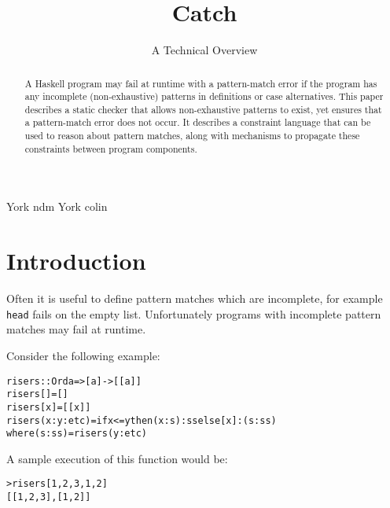 \documentclass[preprint]{sigplanconf}
\newcommand{\T}[1]{\texttt{#1}}
\newenvironment{code}{\begin{alltt}\small}{\end{alltt}}
\begin{document}
\copyrightdata{[to be supplied]}

\titlebanner{\today{} - \currenttime{}}        %

\title{Catch}
\subtitle{A Technical Overview}

           {York}
           {ndm}
           {York}
           {colin}

\maketitle

\begin{abstract}
A Haskell program may fail at runtime with a pattern-match error if the program has any incomplete (non-exhaustive) patterns in definitions or case alternatives. This paper describes a static checker that allows non-exhaustive patterns to exist, yet ensures that a pattern-match error does not occur. It describes a constraint language that can be used to reason about pattern matches, along with mechanisms to propagate these constraints between program components.
\end{abstract}




\section{Introduction}
\label{sec:introduction}

Often it is useful to define pattern matches which are incomplete, for example \T{head} fails on the empty list. Unfortunately programs with incomplete pattern matches may fail at runtime.

Consider the following example:

\begin{code}
risers :: Ord a => [a] -> [[a]]
risers [] = []
risers [x] = [[x]]
risers (x:y:etc) = if x <= y then (x:s):ss else [x]:(s:ss)
    where (s:ss) = risers (y:etc)
\end{code}

A sample execution of this function would be:

\begin{code}
> risers [1,2,3,1,2]
[[1,2,3],[1,2]]
\end{code}
\end{document}
